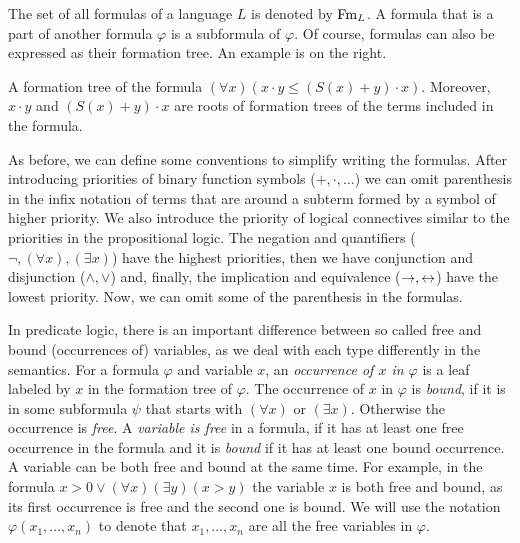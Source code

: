The set of all formulas of a language $L$ is denoted by $\operatorname{Fm}_L$. A formula that is a part of another formula $\varphi$ is a subformula of $\varphi$. Of course, formulas can also be expressed as their formation tree. An example is on the right.

\begin{marginfigure}[-6\baselineskip]
\centering
{}
\caption{A formation tree of the formula $(\forall x) (x \cdot y \leq (S(x) + y)\cdot x)$. Moreover, $x\cdot y$ and $(S(x) + y)\cdot x$ are roots of formation trees of the terms included in the formula.}
\end{marginfigure}

As before, we can define some conventions to simplify writing the formulas. After introducing priorities of binary function symbols ($+, \cdot, \dots$) we can omit parenthesis in the infix notation of terms that are around a subterm formed by a symbol of higher priority. We also introduce the priority of logical connectives similar to the priorities in the propositional logic. The negation and quantifiers ($\neg, (\forall x), (\exists x)$) have the highest priorities, then we have conjunction and disjunction ($\land, \lor$) and, finally, the implication and equivalence ($\to, \leftrightarrow$) have the lowest priority. Now, we can omit some of the parenthesis in the formulas.

In predicate logic, there is an important difference between so called free and bound (occurrences of) variables, as we deal with each type differently in the semantics. For a formula $\varphi$ and variable $x$, an \emph{occurrence of $x$ in $\varphi$} is a leaf labeled by $x$ in the formation tree of $\varphi$. The occurrence of $x$ in $\varphi$ is \emph{bound}, if it is in some subformula $\psi$ that starts with $(\forall x)$ or $(\exists x)$. Otherwise the occurrence is \emph{free}. A \emph{variable is free} in a formula, if it has at least one free occurrence in the formula and it is \emph{bound} if it has at least one bound occurrence. A variable can be both free and bound at the same time. For example, in the formula $x > 0 \lor (\forall x) (\exists y)(x > y)$ the variable $x$ is both free and bound, as its first occurrence is free and the second one is bound. We will use the notation $\varphi(x_1, \dots, x_n)$ to denote that $x_1, \dots, x_n$ are all the free variables in $\varphi$.

